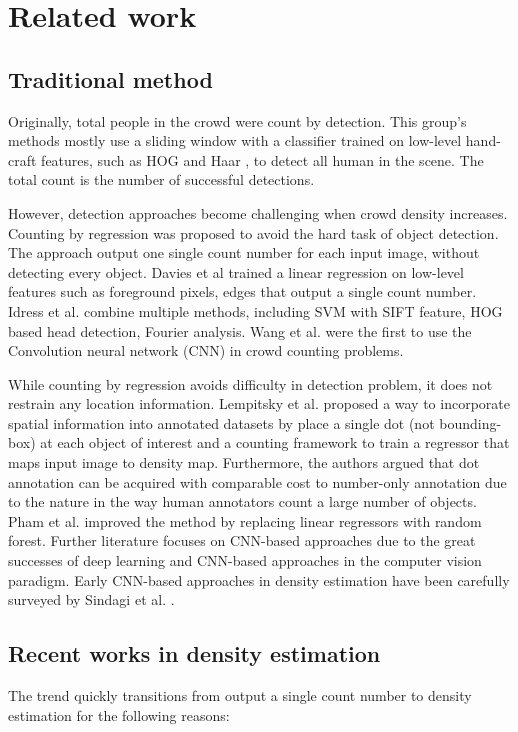 \section{Related work} \label{sec:related}
\subsection{Traditional method}
Originally, total people in the crowd were count by detection. This group's methods mostly use a sliding window with a classifier trained on low-level hand-craft features, such as HOG \cite{dalal2005histograms}  and Haar \cite{lin2001estimation}, to detect all human in the scene. The total count is the number of successful detections.

However, detection approaches become challenging when crowd density increases. Counting by regression was proposed to avoid the hard task of object detection. The approach output one single count number for each input image, without detecting every object. Davies et al \cite{davies1995crowd} trained a linear regression on low-level features such as foreground pixels, edges that output a single count number. Idress et al. \cite{idrees2013multi} combine multiple methods, including SVM with SIFT feature, HOG based head detection, Fourier analysis. Wang et al. \cite{wang2015deep} were the first to use the Convolution neural network (CNN) in crowd counting problems.

While counting by regression avoids difficulty in detection problem, it does not restrain any location information. Lempitsky et al. \cite{lempitsky2010learning} proposed a way to incorporate spatial information into annotated datasets by place a single dot (not bounding-box) at each object of interest and a counting framework to train a regressor that maps input image to density map. Furthermore, the authors argued that dot annotation can be acquired with comparable cost to number-only annotation due to the nature in the way human annotators count a large number of objects. Pham et al. \cite{7410729} improved the method by replacing linear regressors with random forest. Further literature focuses on CNN-based approaches due to the great successes of deep learning and CNN-based approaches in the computer vision paradigm. Early CNN-based approaches in density estimation have been carefully surveyed by Sindagi et al. \cite{SINDAGI20183}.

\subsection{Recent works in density estimation}
The trend quickly transitions from output a single count number to density estimation for the following reasons: 


